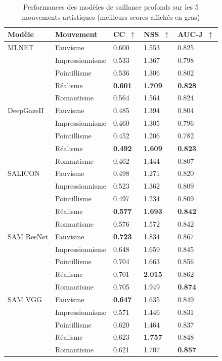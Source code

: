 \begin{table}[ht]
    \centering
        \begin{tabular}{|l|l|l|l|l|}
                \hline
        Modèle & Mouvement & CC~$\uparrow$ & NSS~$\uparrow$  & AUC-J~$\uparrow$\\
                \hline
        MLNET       & Fauvisme & 0.600 & 1.553 & 0.825\\
                    & Impressionnisme & 0.533 & 1.367 & 0.798\\
                    & Pointillisme & 0.536 & 1.306 & 0.802\\
                    & Réalisme & \textbf{0.601} & \textbf{1.709} & \textbf{0.828}\\
                    & Romantisme & 0.564 & 1.564 & 0.824\\
                \hline
        DeepGazeII  & Fauvisme & 0.485 & 1.394 & 0.804\\
                    & Impressionnisme & 0.460 & 1.305 & 0.796\\
                    & Pointillisme & 0.452 & 1.206 & 0.782\\
                    & Réalisme & \textbf{0.492} & \textbf{1.609} & \textbf{0.823}\\
                    & Romantisme & 0.462 & 1.444 & 0.807\\
                \hline
        SALICON     & Fauvisme & 0.498 & 1.271 & 0.820\\
                    & Impressionnisme & 0.523 & 1.362 & 0.809\\
                    & Pointillisme & 0.497 & 1.234 & 0.809\\
                    & Réalisme & \textbf{0.577} & \textbf{1.693} & \textbf{0.842}\\
                    & Romantisme & 0.576 & 1.572 & 0.842\\
                \hline
        SAM ResNet  & Fauvisme & \textbf{0.723} & 1.834 & 0.867\\
                    & Impressionnisme & 0.648 & 1.659 & 0.845\\
                    & Pointillisme & 0.704 & 1.663 & 0.856\\
                    & Réalisme & 0.701 & \textbf{2.015} & 0.862\\
                    & Romantisme & 0.705 & 1.949 & \textbf{0.874}\\
                \hline
        SAM VGG     & Fauvisme & \textbf{0.647} & 1.635 & 0.849\\
                    & Impressionnisme & 0.571 & 1.446 & 0.831\\
                    & Pointillisme & 0.620 & 1.464 & 0.837\\
                    & Réalisme & 0.623 & \textbf{1.757} & 0.848\\
                    & Romantisme & 0.621 & 1.707 & \textbf{0.857}\\
        \hline
        \end{tabular}
    \caption{Performances des modèles de saillance profonds sur les 5 mouvements artistiques (meilleurs scores affichés en gras)}
    \label{tab:scoresmouvement}
\end{table}

